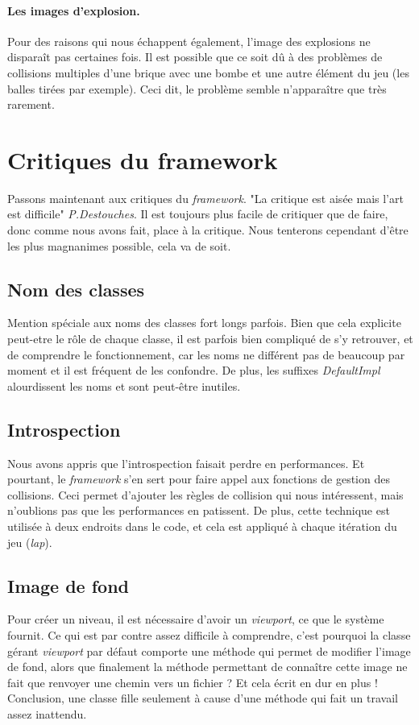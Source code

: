 \documentclass[a4paper,10pt]{article}
\begin{document}
\paragraph{Les images d'explosion.}
Pour des raisons qui nous échappent également, l'image des explosions ne disparaît pas certaines fois. Il est possible
que ce soit dû à des problèmes de collisions multiples d'une brique avec une bombe et une autre élément du jeu (les
balles tirées par exemple). Ceci dit, le problème semble n'apparaître que très rarement.


\section{Critiques du framework }
    Passons maintenant aux critiques du \textit{framework}. "La critique est aisée mais l'art est difficile" \textit{P.Destouches}.
    Il est toujours plus facile de critiquer que de faire, donc comme nous avons fait, place à la critique. Nous tenterons
    cependant d'être les plus magnanimes possible, cela va de soit.

    \subsection{Nom des classes}
        Mention spéciale aux noms des classes fort longs parfois. Bien que cela explicite peut-etre le rôle
        de chaque classe, il est parfois bien compliqué de s'y retrouver, et de comprendre le fonctionnement,
        car les noms ne différent pas de beaucoup par moment et il est fréquent de les confondre.
        De plus, les suffixes \textit{DefaultImpl} alourdissent les noms et sont peut-être inutiles.

    \subsection{Introspection}
       	 Nous avons appris que l'introspection faisait perdre en performances. Et pourtant, le \textit{framework} s'en sert
        pour faire appel aux fonctions de gestion des collisions. Ceci permet d'ajouter les règles de collision
        qui nous intéressent, mais n'oublions pas que les performances en patissent. De plus, cette technique est
        utilisée à deux endroits dans le code, et cela est appliqué à chaque itération du jeu (\textit{lap}).

    \subsection{Image de fond}
        Pour créer un niveau, il est nécessaire d'avoir un \textit{viewport}, ce que le système fournit. Ce qui est
        par contre assez difficile à comprendre, c'est pourquoi la classe gérant \textit{viewport} par défaut
        comporte une méthode qui permet de modifier l'image de fond, alors que finalement la méthode permettant de connaître
        cette image ne fait que renvoyer une chemin vers un fichier ? Et cela écrit en dur en plus ! Conclusion, une classe
        fille seulement à cause d'une méthode qui fait un travail assez inattendu.
\end{document}
